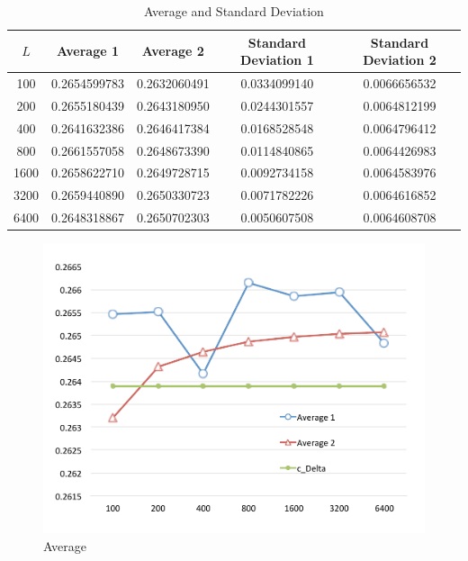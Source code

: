 \documentclass[12pt]{article}
\begin{document}
\begin{table}[htb]
\begin{center} 
  \begin{tabular}{ccccc}
    $L$ & Average 1& Average 2 &  Standard Deviation 1 & Standard Deviation 2\\ \hline 
	100	&	0.2654599783 	&	0.2632060491 	&	0.0334099140 	&	0.0066656532 	\\
	200	&	0.2655180439 	&	0.2643180950 	&	0.0244301557 	&	0.0064812199 	\\
	400	&	0.2641632386 	&	0.2646417384 	&	0.0168528548 	&	0.0064796412 	\\
	800	&	0.2661557058 	&	0.2648673390 	&	0.0114840865 	&	0.0064426983 	\\
	1600	&	0.2658622710 	&	0.2649728715 	&	0.0092734158 	&	0.0064583976 	\\
	3200	&	0.2659440890 	&	0.2650330723 	&	0.0071782226 	&	0.0064616852 	\\
	6400	&	0.2648318867 	&	0.2650702303 	&	0.0050607508 	&	0.0064608708 	\\

  \end{tabular}
  \caption{Average and Standard Deviation} \label{nume}
\end{center}
\end{table}

\begin{figure}[htbp]
\begin{center}
\includegraphics[width=12cm,bb=0 0 500 400]{numeresult1.pdf}
\caption{Average} \label{fig1}
\end{center}
\end{figure} 
\end{document}
